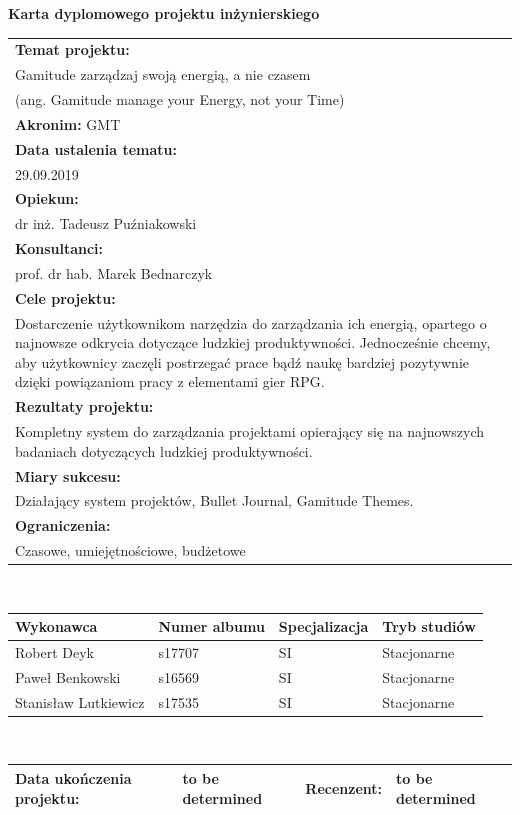 \documentclass[a4paper,11pt]{report}
\begin{document}
\begin{center}
\textbf{\huge Karta dyplomowego projektu inżynierskiego}\\
\vspace{0.5cm}
\begin{tabular}{|p{14cm}|}
\hline
\textbf{Temat projektu:} \\Gamitude zarządzaj swoją energią, a nie czasem \\(ang. Gamitude manage your Energy, not your Time)\\
\hline
\textbf{Akronim:} GMT\\
\hline
\textbf{Data ustalenia tematu:}\\29.09.2019\\
\hline
\textbf{Opiekun:}\\dr inż. Tadeusz Puźniakowski  \\
\hline
\textbf{Konsultanci:}\\ prof. dr hab. Marek Bednarczyk \\
\hline
\textbf{Cele projektu:}
\\Dostarczenie użytkownikom narzędzia do zarządzania ich energią,
 opartego o najnowsze odkrycia dotyczące ludzkiej produktywności.
Jednocześnie chcemy,
 aby użytkownicy zaczęli postrzegać prace bądź naukę bardziej pozytywnie dzięki powiązaniom pracy z elementami gier RPG.\\
\hline
\textbf{Rezultaty projektu:}\\Kompletny system do zarządzania projektami opierający się na najnowszych badaniach dotyczących ludzkiej produktywności. \\
\hline
\textbf{Miary sukcesu:}\\Działający system projektów, Bullet Journal, Gamitude Themes.\\
\hline
\textbf{Ograniczenia:}\\Czasowe, umiejętnościowe, budżetowe \\
\hline
\end{tabular}\\
\vspace{0.5cm}
\begin{tabular}{|p{3.5cm}|p{3cm}|p{3cm}|p{3cm}|}
\hline
\textbf{Wykonawca} & \textbf{Numer albumu}& \textbf{Specjalizacja}& \textbf{Tryb studiów} \\
\hline
Robert Deyk&s17707&SI&Stacjonarne \\
\hline
Paweł Benkowski&s16569&SI&Stacjonarne\\
\hline
Stanisław Lutkiewicz&s17535&SI&Stacjonarne \\
\hline
\end{tabular}\\
\vspace{1cm}
\begin{tabular}{|l|l|l|l|}
\hline
\textbf{Data ukończenia projektu:} & to be determined & \textbf{Recenzent:} & to be determined\\
\hline
\end{tabular}
\end{center}
\tableofcontents
\end{document}
